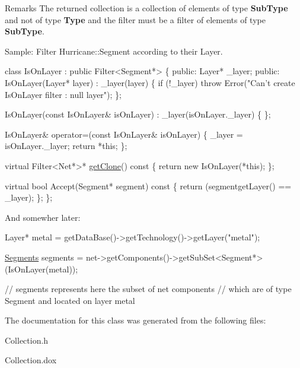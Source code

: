 \begin{DoxyRemark}{Remarks}
The returned collection is a collection of elements of type {\bfseries Sub\+Type} and not of type {\bfseries Type} and the filter must be a filter of elements of type {\bfseries Sub\+Type}.
\end{DoxyRemark}
\begin{DoxyParagraph}{Sample\+: Filter Hurricane\+:\+:Segment according to their Layer.}

\begin{DoxyCode}
\textcolor{keyword}{class }IsOnLayer : \textcolor{keyword}{public} Filter<Segment*> \{
   \textcolor{keyword}{public}:
      Layer* \_layer;
   \textcolor{keyword}{public}:
      IsOnLayer(Layer* layer)
        : \_layer(layer)
      \{
         \textcolor{keywordflow}{if} (!\_layer) \textcolor{keywordflow}{throw} Error(\textcolor{stringliteral}{"Can't create IsOnLayer filter : null layer"});
      \};
 
      IsOnLayer(\textcolor{keyword}{const} IsOnLayer& isOnLayer)
        : \_layer(isOnLayer.\_layer)
      \{ \};
 
      IsOnLayer& operator=(\textcolor{keyword}{const} IsOnLayer& isOnLayer)
      \{
         \_layer = isOnLayer.\_layer;
         \textcolor{keywordflow}{return} *\textcolor{keyword}{this};
      \};
 
      \textcolor{keyword}{virtual} Filter<Net*>* \mbox{\hyperlink{classHurricane_1_1Collection_ac75b91d3952b36e14f21174958523924}{getClone}}()\textcolor{keyword}{ const}
\textcolor{keyword}{      }\{
         \textcolor{keywordflow}{return} \textcolor{keyword}{new} IsOnLayer(*\textcolor{keyword}{this});
      \};
 
      \textcolor{keyword}{virtual} \textcolor{keywordtype}{bool} Accept(Segment* segment)\textcolor{keyword}{ const}
\textcolor{keyword}{      }\{
         \textcolor{keywordflow}{return} (segmentgetLayer() == \_layer);
      \};
\};
\end{DoxyCode}

\end{DoxyParagraph}
And somewher later\+: 
\begin{DoxyCode}
Layer* metal = getDataBase()->getTechnology()->getLayer(\textcolor{stringliteral}{"metal"});
 
\mbox{\hyperlink{namespaceHurricane_a30748fa53a81cb597d4a13d651238716}{Segments}} segments = net->getComponents()->getSubSet<Segment*>(IsOnLayer(metal));
 
\textcolor{comment}{// segments represents here the subset of net components}
\textcolor{comment}{// which are of type Segment and located on layer metal}
\end{DoxyCode}
 

The documentation for this class was generated from the following files\+:\begin{DoxyCompactItemize}
\item 
Collection.\+h\item 
Collection.\+dox\end{DoxyCompactItemize}
